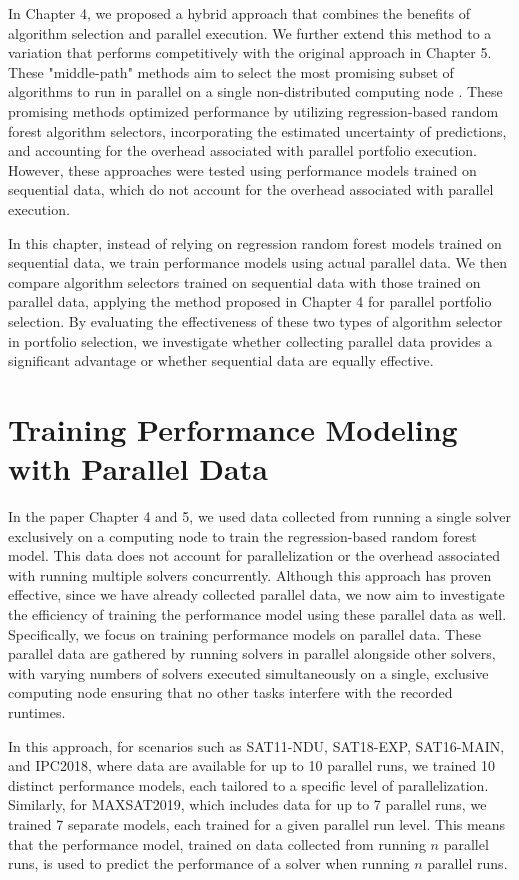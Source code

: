 In Chapter 4, we proposed a hybrid approach that combines the benefits of algorithm selection and parallel execution. We further extend this method to a variation that performs competitively with the original approach in Chapter 5. These "middle-path" methods aim to select the most promising subset of algorithms to run in parallel on a single non-distributed computing node \cite{kashgarani2023automatic}. These promising methods optimized performance by utilizing regression-based random forest algorithm selectors, incorporating the estimated uncertainty of predictions, and accounting for the overhead associated with parallel portfolio execution. However, these approaches were tested using performance models trained on sequential data, which do not account for the overhead associated with parallel execution.

In this chapter, instead of relying on regression random forest models trained on sequential data, we train performance models using actual parallel data. We then compare algorithm selectors trained on sequential data with those trained on parallel data, applying the method proposed in Chapter 4 for parallel portfolio selection. By evaluating the effectiveness of these two types of algorithm selector in portfolio selection, we investigate whether collecting parallel data provides a significant advantage or whether sequential data are equally effective.

\section{Training Performance Modeling with Parallel Data}
In the paper Chapter 4 and 5\cite{kashgarani2023automatic}, we used data collected from running a single solver exclusively on a computing node to train the regression-based random forest model. This data does not account for parallelization or the overhead associated with running multiple solvers concurrently. Although this approach has proven effective, since we have already collected parallel data, we now aim to investigate the efficiency of training the performance model using these parallel data as well. Specifically, we focus on training performance models on parallel data. These parallel data are gathered by running solvers in parallel alongside other solvers, with varying numbers of solvers executed simultaneously on a single, exclusive computing node ensuring that no other tasks interfere with the recorded runtimes.

In this approach, for scenarios such as SAT11-NDU, SAT18-EXP, SAT16-MAIN, and IPC2018, where data are available for up to 10 parallel runs, we trained 10 distinct performance models, each tailored to a specific level of parallelization. Similarly, for MAXSAT2019, which includes data for up to 7 parallel runs, we trained 7 separate models, each trained for a given parallel run level. This means that the performance model, trained on data collected from running $n$ parallel runs, is used to predict the performance of a solver when running $n$ parallel runs. 

